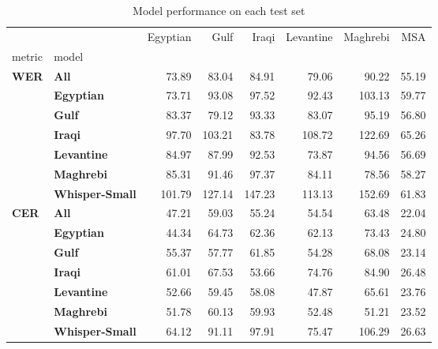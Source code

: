 \begin{table}
\caption{Model performance on each test set}
\label{tab:ex_finetune}
\begin{tabular}{llrrrrrr}
\toprule
 &  & Egyptian & Gulf & Iraqi & Levantine & Maghrebi & MSA \\
metric & model &  &  &  &  &  &  \\
\midrule
\multirow[t]{7}{*}{\textbf{WER}} & \textbf{All} & 73.89 & 83.04 & 84.91 & 79.06 & 90.22 & 55.19 \\
\textbf{} & \textbf{Egyptian} & 73.71 & 93.08 & 97.52 & 92.43 & 103.13 & 59.77 \\
\textbf{} & \textbf{Gulf} & 83.37 & 79.12 & 93.33 & 83.07 & 95.19 & 56.80 \\
\textbf{} & \textbf{Iraqi} & 97.70 & 103.21 & 83.78 & 108.72 & 122.69 & 65.26 \\
\textbf{} & \textbf{Levantine} & 84.97 & 87.99 & 92.53 & 73.87 & 94.56 & 56.69 \\
\textbf{} & \textbf{Maghrebi} & 85.31 & 91.46 & 97.37 & 84.11 & 78.56 & 58.27 \\
\textbf{} & \textbf{Whisper-Small} & 101.79 & 127.14 & 147.23 & 113.13 & 152.69 & 61.83 \\
\cline{1-8}
\multirow[t]{7}{*}{\textbf{CER}} & \textbf{All} & 47.21 & 59.03 & 55.24 & 54.54 & 63.48 & 22.04 \\
\textbf{} & \textbf{Egyptian} & 44.34 & 64.73 & 62.36 & 62.13 & 73.43 & 24.80 \\
\textbf{} & \textbf{Gulf} & 55.37 & 57.77 & 61.85 & 54.28 & 68.08 & 23.14 \\
\textbf{} & \textbf{Iraqi} & 61.01 & 67.53 & 53.66 & 74.76 & 84.90 & 26.48 \\
\textbf{} & \textbf{Levantine} & 52.66 & 59.45 & 58.08 & 47.87 & 65.61 & 23.76 \\
\textbf{} & \textbf{Maghrebi} & 51.78 & 60.13 & 59.93 & 52.48 & 51.21 & 23.52 \\
\textbf{} & \textbf{Whisper-Small} & 64.12 & 91.11 & 97.91 & 75.47 & 106.29 & 26.63 \\
\cline{1-8}
\bottomrule
\end{tabular}
\end{table}
